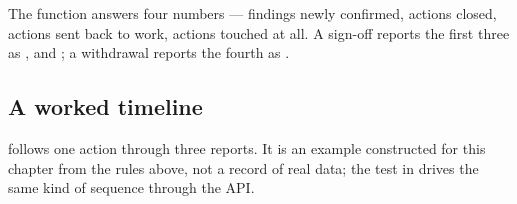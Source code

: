 The function answers four numbers --- findings newly confirmed, actions closed, actions sent
back to work, actions touched at all. A sign-off reports the first three as ,
 and ; a withdrawal reports the fourth as .

\subsection{A worked timeline}

 follows one action through three reports. It is an example
constructed for this chapter from the rules above, not a record of real data; the test
 in  drives the
same kind of sequence through the API.

